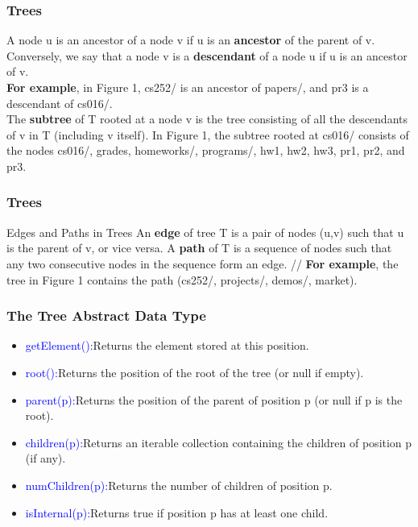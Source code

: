 \documentclass[11pt]{beamer}
\begin{document}
	\begin{frame}
	\frametitle{Trees}
		A node u is an ancestor of a node v if u is an \textbf{ancestor} of the parent of v. \\
		Conversely, we say that a node v is a \textbf{descendant} of a node u if u is an ancestor of v. \\
		\textbf{For example}, in Figure 1, cs252/ is an ancestor of papers/, and pr3 is a descendant of cs016/. \\
		The \textbf{subtree} of T rooted at a node v is the tree consisting of all the descendants of v in T (including v itself). In Figure 1, the subtree rooted at cs016/ consists of the nodes cs016/, grades, homeworks/, programs/, hw1, hw2, hw3, pr1, pr2, and pr3.
    \end{frame}

    \begin{frame}
    	\frametitle{Trees}
    		\begin{block}{	Edges and Paths in Trees}
    			An \textbf{edge} of tree T is a pair of nodes (u,v) such that u is the parent of v, or vice versa. A \textbf{path} of T is a sequence of nodes such that any two consecutive nodes in the sequence form an edge. //
    			\textbf{For example}, the tree in Figure 1 contains the path (cs252/, projects/, demos/, market).
    	\end{block}
    \end{frame}

     \begin{frame}
   	\frametitle{The Tree Abstract Data Type}
    \begin{itemize}
    	\item \textcolor{blue}{getElement():}Returns the element stored at this position. 
    	\item \textcolor{blue}{root():}Returns the position of the root of the tree (or null if empty).
    	\item \textcolor{blue}{parent(p):}Returns the position of the parent of position p (or null if p is the root).
    	\item \textcolor{blue}{children(p):}Returns an iterable collection containing the children of position p (if any).
    	\item \textcolor{blue}{numChildren(p):}Returns the number of children of position p.
    	\item \textcolor{blue}{isInternal(p):}Returns true if position p has at least one child.
    \end{itemize}
   \end{frame}
  
\end{document}
